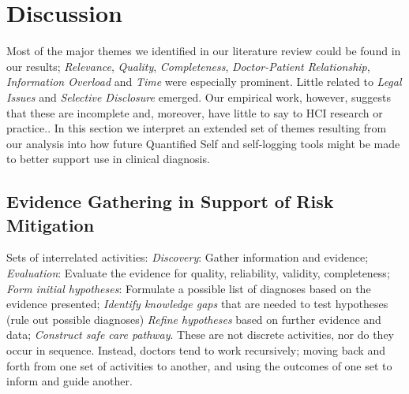 \documentclass{sigchi}
\begin{document}



\section{Discussion}

Most of the major themes we identified in our literature review could be found in our results; \emph{Relevance}, \emph{Quality}, \emph{Completeness}, \emph{Doctor-Patient Relationship}, \emph{Information Overload} and \emph{Time} were especially prominent. Little related to \emph{Legal Issues} and \emph{Selective Disclosure} emerged. Our empirical work, however, suggests that these are incomplete and, moreover, have little to say to HCI research or practice.. In this section we interpret an extended set of  themes resulting from our analysis into how future Quantified Self and self-logging tools might be made to better support use in clinical diagnosis.


\subsection{Evidence Gathering in Support of Risk Mitigation} %
\label{sec:riskmit}

Sets of interrelated activities: \emph{Discovery}: Gather information and evidence; \emph{Evaluation}: Evaluate the evidence for quality, reliability, validity, completeness; \emph{Form initial hypotheses}: Formulate a possible list of diagnoses based on the evidence presented; \emph{Identify knowledge gaps} that are needed to test hypotheses (rule out possible diagnoses) \emph{Refine hypotheses} based on further evidence and data; \emph{Construct safe care pathway}.  These are not discrete activities, nor do they occur in sequence.  Instead, doctors tend to work recursively; moving back and forth from one set of activities to another, and using the outcomes of one set to inform and guide another.
\end{document}

